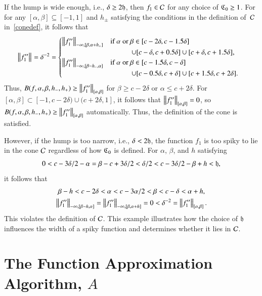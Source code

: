 \documentclass[review]{elsarticle}
\theoremstyle{definition}
\begin{document}
If the hump is wide enough, i.e., $\delta \ge 2 \fh$, then $f_1 \in \cc$ for any
choice of $\fC_0 \ge 1$. For for any $[\alpha,\beta]\subseteq [-1,1]$ and
$h_{\pm}$ satisfying the conditions in the definition of~$\cc$ in~\eqref{conedef}, 
it follows that
\begin{align*}
    & \norm{f''_1} = \delta^{-2} =
\begin{cases}
\norm[-\infty,{[\beta,\alpha+h_+]}]{f''_1}  %
   & \text{if } \alpha\text{ or } \beta \in [c - 2\delta,  c - 1.5\delta]  
\\ & \qquad\quad \cup [c - \delta,  c + 0.5\delta] \cup [c + \delta, c+1.5\delta],
\\ \norm[-\infty,{[\beta - h_-,\alpha]}]{f''_1} %
   & \text{if } \alpha\text{ or } \beta \in [c - 1.5\delta,  c - \delta]
\\ & \qquad\quad  \cup [c - 0.5 \delta,  c + \delta] \cup [c + 1.5\delta, c+2\delta].
\end{cases}
\end{align*}
Thus, $B(f,\alpha,\beta,h_-,h_+)\ge\norm[{[\alpha,\beta]}]{f''_1}$ for $\beta
\ge c - 2\delta$ or $\alpha \le c + 2\delta$. 
For $[\alpha,\beta] \subset [-1,c
- 2\delta) \cup (c+2\delta, 1]$, it follows that $\norm[{[\alpha,\beta]}]{f''_1} =
0$, so $B(f,\alpha,\beta,h_-,h_+)\ge\norm[{[\alpha,\beta]}]{f''_1}$
automatically. Thus, the definition of the cone is satisfied.

However, if the hump is too narrow, i.e., $\delta < 2 \fh$, the function $f_1$
is too spiky to lie in the cone $\cc$ regardless of how $\fC_0$ is defined. For
$\alpha$, $\beta$, and $h$ satisfying
\[
0 < c - 3\delta/2 -\alpha =  \beta - c+ 3\delta/2 < \delta/2 < c-3\delta/2 - \beta + h < \fh,
\]
it follows that
\begin{gather*}
   \beta -  h < c - 2 \delta < \alpha < c - 3\alpha/2 < \beta < c - \delta < \alpha + h, 
\\ \norm[-\infty,{[\beta - h,\alpha]}]{f''_1} =\norm[-\infty,{[\beta,\alpha+h]}]{f''_1}=0 
< \delta^{-2} =\norm[{[\alpha,\beta]}]{f''_1}.
\end{gather*}
This violates the definition of $\cc$. This example illustrates how the choice
of $\fh$ influences the width of a spiky function and determines whether it lies in
$\cc$.


\section{The Function Approximation Algorithm, $A$}\label{sec:fappx}
\end{document}
